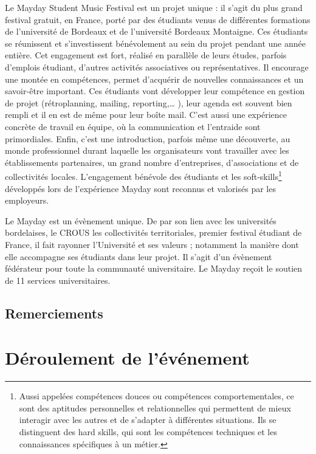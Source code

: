 \documentclass[12pt,a4paper]{report}
\begin{document}
Le Mayday Student Music Festival est un projet unique : il s'agit du plus grand festival gratuit, en France, porté par des étudiants venus de différentes formations de l’université de Bordeaux et de l’université Bordeaux Montaigne. Ces étudiants se réunissent et s’investissent bénévolement au sein du projet pendant une année entière. Cet engagement est fort, réalisé en parallèle de leurs études, parfois d’emplois étudiant, d’autres activités associatives ou représentatives. Il encourage une montée en compétences, permet d'acquérir de nouvelles connaissances et un savoir-être important. Ces étudiants vont développer leur compétence en gestion de projet (rétroplanning, mailing, reporting,… ), leur agenda est souvent bien rempli et il en est de même pour leur boîte mail. C’est aussi une expérience concrète de travail en équipe, où la communication et l'entraide sont primordiales. Enfin, c’est une introduction, parfois même une découverte, au monde professionnel durant laquelle les organisateurs vont travailler avec les établissements partenaires, un grand nombre d'entreprises, d’associations et de collectivités locales. L’engagement bénévole des étudiants et les soft-skills\footnote{ Aussi appelées compétences douces ou compétences comportementales, ce sont des aptitudes personnelles et relationnelles qui permettent de mieux interagir avec les autres et de s'adapter à différentes situations. Ils se distinguent des hard skills, qui sont les compétences techniques et les connaissances spécifiques à un métier.} développés lors de l’expérience Mayday sont reconnus et valorisés par les employeurs.

Le Mayday est un évènement unique. De par son lien avec les universités bordelaises, le CROUS les collectivités territoriales, premier festival étudiant de France, il fait rayonner l’Université et ses valeurs ; notamment la manière dont elle accompagne ses étudiants dans leur projet. Il s’agit d’un évènement fédérateur pour toute la communauté universitaire. Le Mayday reçoit le soutien de 11 services universitaires. 

\section*{Remerciements}

\newpage

\chapter{Déroulement de l'événement}
\end{document}

